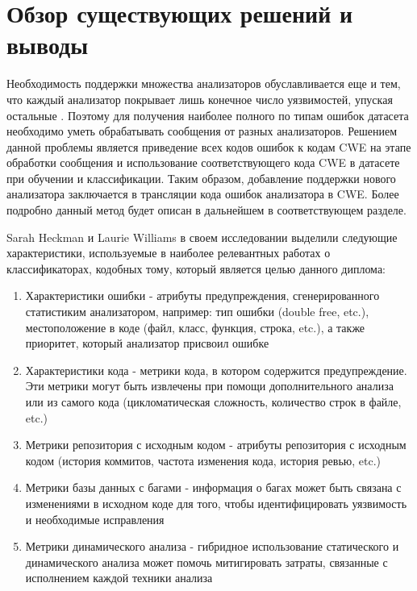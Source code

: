 \chapter{Обзор существующих решений и выводы}
\label{sec:Chapter2} 

Необходимость поддержки множества анализаторов обуславливается еще и тем, что каждый анализатор покрывает лишь конечное число уязвимостей, упуская остальные\cite{Delaitre2013OfMS} \cite{3291} \cite{Bessey2010AFB}. Поэтому для получения наиболее полного по типам ошибок датасета необходимо уметь обрабатывать сообщения от разных анализаторов. Решением данной проблемы является приведение всех кодов ошибок к кодам CWE \cite{CWE-doc} на этапе обработки сообщения и использование соответствующего кода CWE в датасете при обучении и классификации. Таким образом, добавление поддержки нового анализатора заключается в трансляции кода ошибок анализатора в CWE. Более подробно данный метод будет описан в дальнейшем в соответствующем разделе.

Sarah Heckman и Laurie Williams в своем исследовании\cite{HECKMAN2011363} выделили следующие характеристики, используемые в наиболее релевантных работах о классификаторах, кодобных тому, который является целью данного диплома:
\begin{enumerate}
    \item Характеристики ошибки - атрибуты предупреждения, сгенерированного статистиким анализатором, например: тип ошибки (double free, etc.), местоположение в коде (файл, класс, функция, строка, etc.), а также приоритет, который анализатор присвоил ошибке
    \item Характеристики кода - метрики кода, в котором содержится предупреждение. Эти метрики могут быть извлечены при помощи дополнительного анализа или из самого кода (цикломатическая сложность, количество строк в файле, etc.)
    \item Метрики репозитория с исходным кодом - атрибуты репозитория с исходным кодом (история коммитов, частота изменения кода, история ревью, etc.)
    \item Метрики базы данных с багами - информация о багах может быть связана с изменениями в исходном коде для того, чтобы идентифицировать уязвимость и необходимые исправления
    \item Метрики динамического анализа - гибридное использование статического и динамического анализа может помочь митигировать затраты, связанные с исполнением каждой техники анализа
\end{enumerate}


